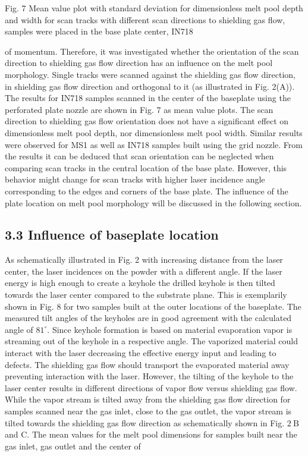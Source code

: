 \documentclass[10pt]{article}
\begin{document}
Fig. 7 Mean value plot with standard deviation for dimensionless melt pool depth and width for scan tracks with different scan directions to shielding gas flow, samples were placed in the base plate center, IN718

of momentum. Therefore, it was investigated whether the orientation of the scan direction to shielding gas flow direction has an influence on the melt pool morphology. Single tracks were scanned against the shielding gas flow direction, in shielding gas flow direction and orthogonal to it (as illustrated in Fig. 2(A)). The results for IN718 samples scanned in the center of the baseplate using the perforated plate nozzle are shown in Fig. 7 as mean value plots. The scan direction to shielding gas flow orientation does not have a significant effect on dimensionless melt pool depth, nor dimensionless melt pool width. Similar results were observed for MS1 as well as IN718 samples built using the grid nozzle. From the results it can be deduced that scan orientation can be neglected when comparing scan tracks in the central location of the base plate. However, this behavior might change for scan tracks with higher laser incidence angle corresponding to the edges and corners of the base plate. The influence of the plate location on melt pool morphology will be discussed in the following section.

\subsection*{3.3 Influence of baseplate location}
As schematically illustrated in Fig. 2 with increasing distance from the laser center, the laser incidences on the powder with a different angle. If the laser energy is high enough to create a keyhole the drilled keyhole is then tilted towards the laser center compared to the substrate plane. This is exemplarily shown in Fig. 8 for two samples built at the outer locations of the baseplate. The measured tilt angles of the keyholes are in good agreement with the calculated angle of $81^{\circ}$. Since keyhole formation is based on material evaporation vapor is streaming out of the keyhole in a respective angle. The vaporized material could interact with the laser decreasing the effective energy input and leading to defects. The shielding gas flow should transport the evaporated material away preventing interaction with the laser. However, the tilting of the keyhole to the laser center results in different directions of vapor flow versus shielding gas flow. While the vapor stream is tilted away from the shielding gas flow direction for samples scanned near the gas inlet, close to the gas outlet, the vapor stream is tilted towards the shielding gas flow direction as schematically shown in Fig. $2 \mathrm{~B}$ and $\mathrm{C}$. The mean values for the melt pool dimensions for samples built near the gas inlet, gas outlet and the center of
\end{document}
